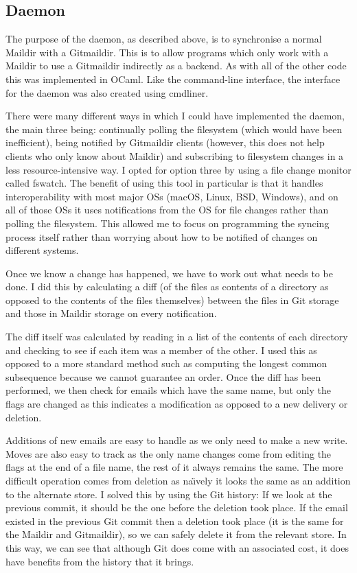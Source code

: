 \subsection{Daemon}

The purpose of the daemon, as described above, is to synchronise a normal Maildir with a Gitmaildir. This is to allow programs which only work with a Maildir to use a Gitmaildir indirectly as a backend. As with all of the other code this was implemented in OCaml. Like the command-line interface, the interface for the daemon was also created using cmdliner.

There were many different ways in which I could have implemented the daemon, the main three being: continually polling the filesystem (which would have been inefficient), being notified by Gitmaildir clients (however, this does not help clients who only know about Maildir) and subscribing to filesystem changes in a less resource-intensive way. I opted for option three by using a file change monitor called fswatch\cite{code_fswatch}. The benefit of using this tool in particular is that it handles interoperability with most major OSs (macOS, Linux, BSD, Windows), and on all of those OSs it uses notifications from the OS for file changes rather than polling the filesystem. This allowed me to focus on programming the syncing process itself rather than worrying about how to be notified of changes on different systems.

Once we know a change has happened, we have to work out what needs to be done. I did this by calculating a diff (of the files as contents of a directory as opposed to the contents of the files themselves) between the files in Git storage and those in Maildir storage on every notification.

The diff itself was calculated by reading in a list of the contents of each directory and checking to see if each item was a member of the other. I used this as opposed to a more standard method such as computing the longest common subsequence because we cannot guarantee an order. Once the diff has been performed, we then check for emails which have the same name, but only the flags are changed as this indicates a modification as opposed to a new delivery or deletion.

Additions of new emails are easy to handle as we only need to make a new write. Moves are also easy to track as the only name changes come from editing the flags at the end of a file name, the rest of it always remains the same. The more difficult operation comes from deletion as na\"{\i}vely it looks the same as an addition to the alternate store. I solved this by using the Git history: If we look at the previous commit, it should be the one before the deletion took place. If the email existed in the previous Git commit then a deletion took place (it is the same for the Maildir and Gitmaildir), so we can safely delete it from the relevant store. In this way, we can see that although Git does come with an associated cost, it does have benefits from the history that it brings.

